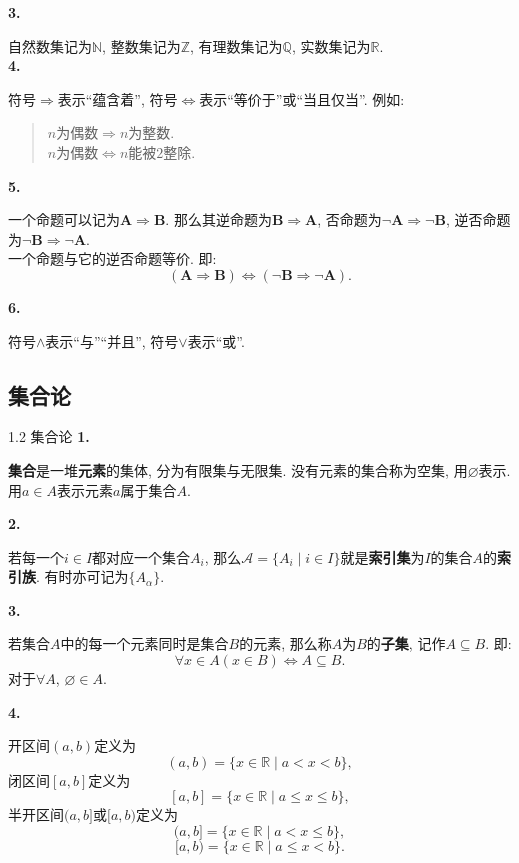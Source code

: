 \documentclass[serif]{beamer}
\begin{document}
\begin{frame}
	\noindent\textbf{3.}\par
	自然数集记为$\mathbb{N}$, 整数集记为$\mathbb{Z}$, 有理数集记为$\mathbb{Q}$, 实数集记为$\mathbb{R}$.\\
	\noindent\textbf{4.}\par
	符号$\Rightarrow$表示“蕴含着”, 符号$\Leftrightarrow$表示“等价于”或“当且仅当”. 例如:
	\begin{quotation}
		$n$为偶数$\Rightarrow n$为整数.\\
		$n$为偶数$\Leftrightarrow n$能被$2$整除.
	\end{quotation}
	\noindent\textbf{5.}\par
	一个命题可以记为$\mathbf{A}\Rightarrow\mathbf{B}$. 那么其逆命题为$\mathbf{B}\Rightarrow\mathbf{A}$, 否命题为$\neg\mathbf{A}\Rightarrow\neg\mathbf{B}$,
	逆否命题为$\neg\mathbf{B}\Rightarrow\neg\mathbf{A}$.\\
	一个命题与它的逆否命题等价. 即:
	\[(\mathbf{A}\Rightarrow\mathbf{B})\Leftrightarrow(\neg\mathbf{B}\Rightarrow\neg\mathbf{A}).\]\par
	\noindent\textbf{6.}\par
	符号$\wedge$表示“与”“并且”, 符号$\vee$表示“或”.
\end{frame}

\subsection{\kaishu 集合论}

\begin{frame}{1.2 集合论}
	\noindent\textbf{1.}\par
	\textbf{集合}是一堆\textbf{元素}的集体, 分为有限集与无限集. 没有元素的集合称为空集, 用$\varnothing$表示. 用$a\in A$表示元素$a$属于集合$A$.\par
	\noindent\textbf{2.}\par
	若每一个$i\in I$都对应一个集合$A_i$, 那么$\mathcal{A}=\{A_i\mid i\in I\}$就是\textbf{索引集}为$I$的集合$A$的\textbf{索引族}. 有时亦可记为$\{A_\alpha\}$.\par
	\noindent\textbf{3.}\par
	若集合$A$中的每一个元素同时是集合$B$的元素, 那么称$A$为$B$的\textbf{子集}, 记作$A\subseteq B$. 即:
	\[\forall x\in A(x\in B)\Leftrightarrow A\subseteq B.\]
	对于$\forall A$, $\varnothing\in A$.
\end{frame}

\begin{frame}
	\noindent\textbf{4.}\par
	开区间$(a,b)$定义为
	\[(a,b)=\{x\in\mathbb{R}\mid a<x<b\},\]
	闭区间$[a,b]$定义为
	\[[a,b]=\{x\in\mathbb{R}\mid a\le x\le b\},\]
	半开区间$(a,b]$或$[a,b)$定义为
	\[(a,b]=\{x\in\mathbb{R}\mid a<x\le b\},\]
	\[[a,b)=\{x\in\mathbb{R}\mid a\le x<b\}.\]
	
\end{frame}
\end{document}
